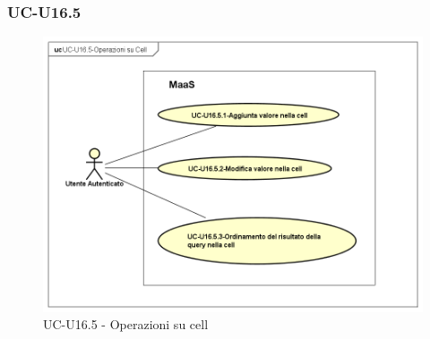 \subsubsection{UC-U16.5}
 

    \begin{figure}[H]
      \begin{center}
        \includegraphics[width=12cm]{res/img/UCUtenti/UCUtenteA/UC-U16.5-Operazioni_su_Cell/UC-U16.5-Operazioni_su_Cell}
      \caption{UC-U16.5 - Operazioni su cell}
      \end{center} 
    \end{figure}

